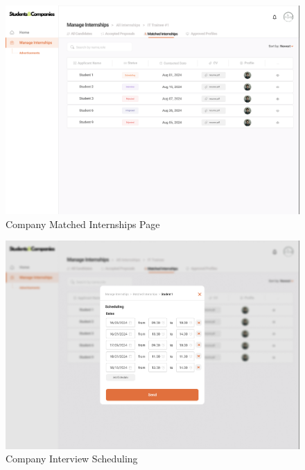 \documentclass{article}
\begin{document}
\begin{figure}[H]
    \centering
    \includegraphics[scale = 0.42]{figures/UserInterfaces/Company/MatchedCompany.png}
    \caption{Company Matched Internships Page}
     \centering
\end{figure}
\begin{figure}[H]
    \centering
    \includegraphics[scale = 0.42]{figures/UserInterfaces/Company/Scheduling.png}
    \caption{Company Interview Scheduling}
     \centering
\end{figure}
\end{document}
